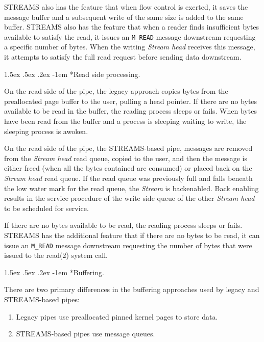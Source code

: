 \documentclass[letterpaper,final,notitlepage,twocolumn,10pt,twoside]{article}
\makeatletter
\let\normalsize\small
\let\small\footnotesize
\let\footnotesize\scriptsize
\let\scriptsize\tiny
\renewcommand\paragraph{\@startsection{paragraph}{4}{\z@}%
                                    {1.5ex \@plus .5ex \@minus .2ex}%
                                    {-1em}%
                                    {\normalfont\normalsize\bfseries\slshape}}
\makeatother
\begin{document}
STREAMS also has the feature that when flow control is exerted, it saves the
message buffer and a subsequent write of the same size is added to the same
buffer.  STREAMS also has the feature that when a reader finds insufficient
bytes available to satisfy the read, it issues an \texttt{M\_READ} message
downstream requesting a specific number of bytes.  When the writing
\textit{Stream head} receives this message, it attempts to satisfy the full
read request before sending data downstream.

\paragraph*{Read side processing.}

On the read side of the pipe, the legacy approach copies bytes from the
preallocated page buffer to the user, pulling a head pointer.  If there are no
bytes available to be read in the buffer, the reading process sleeps or fails.
When bytes have been read from the buffer and a process is sleeping waiting to
write, the sleeping process is awoken.

On the read side of the pipe, the STREAMS-based pipe, messages are removed
from the \textit{Stream head} read queue, copied to the user, and then the
message is either freed (when all the bytes contained are consumed) or placed
back on the \textit{Stream head} read queue.  If the read queue was previously
full and falls beneath the low water mark for the read queue, the
\textit{Stream} is backenabled.  Back enabling results in the service
procedure of the write side queue of the other \textit{Stream head} to be
scheduled for service.

If there are no bytes available to be read, the reading process sleeps or
fails.  STREAMS has the additional feature that if there are no bytes to be
read, it can issue an \texttt{M\_READ} message downstream requesting the
number of bytes that were issued to the read(2) system call.

\paragraph*{Buffering.}

There are two primary differences in the buffering approaches used by legacy
and STREAMS-based pipes:

\begin{enumerate}

\item Legacy pipes use preallocated pinned kernel pages to store data.

\item STREAMS-based pipes use message queues.

\end{enumerate}
\end{document}
